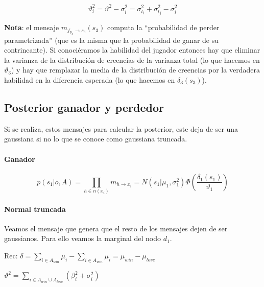 \documentclass[11pt,twoside,spanish]{report} %
\begin{document}
\begin{equation}
	\vartheta_i^2 = \vartheta^2 - \sigma_i^2 = \sigma_{t_i}^2 + \sigma_{t_j}^2 - \sigma_i^2
\end{equation}


\textbf{Nota}: el mensaje $m_{f_{p_3} \rightarrow s_3}(s_3)$ computa la ``probabilidad de perder parametrizada'' (que es la misma que la probabilidad de ganar de su contrincante). Si conoci\'eramos la habilidad del jugador entonces hay que eliminar la varianza de la distribuci\'on de creencias de la varianza total (lo que hacemos en $\vartheta_3$) y hay que remplazar la media de la distribuci\'on de creencias por la verdadera habilidad en la diferencia esperada (lo que hacemos en $\delta_3(s_3)$).







\subsection{Posterior ganador y perdedor}
\label{appendix:trunc}
Si se realiza, estos mensajes para calcular la posterior, este deja de ser una gaussiana si no lo que se conoce como gaussiana truncada.

\paragraph{Ganador}
\begin{equation}\label{eq:posterior_ganador}
	p(s_1|o,A) = \prod_{h \in n(x_i)} m_{h \rightarrow x_i} =  N(s_1| \mu_1, \sigma_1^2)  \Phi\left(\frac{\delta_1(s_1)}{\vartheta_1}\right)
\end{equation}

\paragraph{Normal truncada}\label{appendix:truncada}
Veamos el mensaje que genera que el resto de los mensajes dejen de ser gaussianos. Para ello veamos la marginal del nodo $d_1$.

Rec: $\delta = \sum_{i\in A_{win}}\mu_i-\sum_{i\in A_{win}}\mu_i= \mu_{win}-\mu_{lose}$

$\vartheta^2 = \sum_{i\in A_{win}\cup A_{lose}}(\beta_i^2+\sigma_i^2)	$
\end{document}
